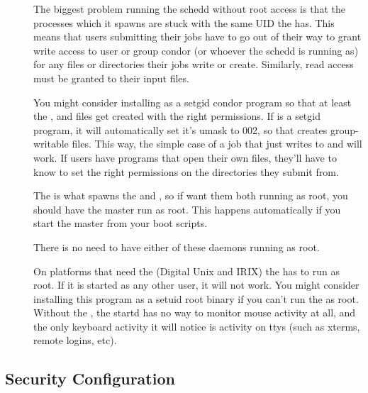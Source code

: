 \begin{description}
\item[] The biggest problem running the schedd
    without root access is that the  processes which it
    spawns are stuck with the same UID the  has.  This
    means that users submitting their jobs have to go out of their way
    to grant write access to user or group condor (or whoever the
    schedd is running as) for any files or directories their jobs
    write or create.  Similarly, read access must be granted to their
    input files.

    You might consider installing  as a setgid condor
    program so that at least the ,  and
     files get created with the right permissions.  If
     is a setgid program, it will automatically set
    it's umask to 002, so that creates group-writable files.  This
    way, the simple case of a job that just writes to 
    and  will work.  If users have programs that open
    their own files, they'll have to know to set the right permissions
    on the directories they submit from.

\item[] The  is what spawns the
     and , so if want them both running
    as root, you should have the master run as root.  This happens
    automatically if you start the master from your boot scripts.

\item[]
\item[] There is no need to have either of these
daemons running as root.

\item[] On platforms that need the  (Digital
    Unix and IRIX) the  has to run as root.  If it is
    started as any other user, it will not work.  You might consider
    installing this program as a setuid root binary if you can't run
    the  as root.  Without the , the
    startd has no way to monitor mouse activity at all, and the only
    keyboard activity it will notice is activity on ttys (such as
    xterms, remote logins, etc).

\end{description}

\subsection{\label{sec:Config-Security} Security Configuration}

